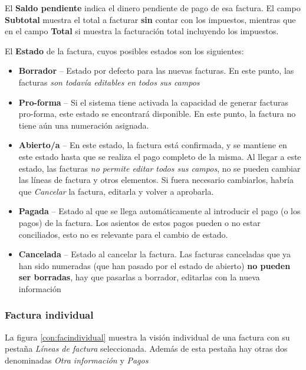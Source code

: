 El \textbf{Saldo pendiente} indica el dinero pendiente de pago de esa factura. El campo \textbf{Subtotal} muestra el total a facturar \textbf{sin} contar con los impuestos, mientras que en el campo \textbf{Total} si muestra la facturación total incluyendo los impuestos.

El \textbf{Estado} de la factura, cuyos posibles estados son los siguientes:

\begin{itemize}
  \item \textbf{Borrador} -- Estado por defecto para las nuevas facturas. En este punto, las facturas \emph{son todavía editables en todos sus
                             campos}
  \item \textbf{Pro-forma} -- Si el sistema tiene activada la capacidad de generar facturas pro-forma, este estado se encontrará disponible. En
                             este punto, la factura no tiene aún una numeración asignada.
  \item \textbf{Abierto/a} -- En este estado, la factura está confirmada, y se mantiene en este estado hasta que se realiza el pago completo
                             de la misma. Al llegar a este estado, las facturas \emph{no permite editar todos sus campos}, no se pueden cambiar
                             las líneas de factura y otros elementos. Si fuera necesario cambiarlos, habría que \emph{Cancelar} la factura, editarla
                             y volver a aprobarla.
  \item \textbf{Pagada} -- Estado al que se llega automáticamente al introducir el pago (o los pagos) de la factura. Los asientos de estos pagos pueden
                           o no estar conciliados, esto no es relevante para el cambio de estado.
  \item \textbf{Cancelada} -- Estado al cancelar la factura. Las facturas canceladas que ya han sido numeradas (que han pasado por el estado de
                           abierto) \textbf{no pueden ser borradas}, hay que pasarlas a borrador, editarlas con la nueva información
\end{itemize}


\subsubsection{Factura individual}
\label{contabilidad:factura}
La figura \ref{con:facindividual} muestra la visión individual de una factura con su pestaña \emph{Líneas de factura} seleccionada. Además de esta pestaña hay otras dos denominadas \emph{Otra información} y \emph{Pagos}

